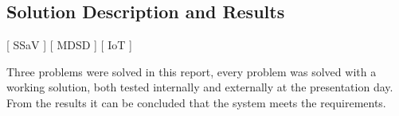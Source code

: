 \subsection{Solution Description and Results}
[ SSaV ] [ MDSD ] [ IoT ] 
\newline

Three problems were solved in this report, every problem was solved with a working solution, both tested internally and externally at the presentation day.
From the results it can be concluded that the system meets the requirements.